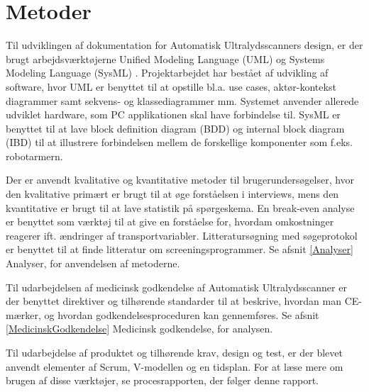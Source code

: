 \chapter{Metoder}\label{Metoder}

Til udviklingen af dokumentation for Automatisk Ultralydsscanners design, er der brugt arbejdsværktøjerne Unified Modeling Language (UML) \cite{UML}  og Systems Modeling Language (SysML) \cite{SysML}. Projektarbejdet har bestået af udvikling af software, hvor UML er benyttet til at opstille bl.a. use cases, aktør-kontekst diagrammer samt sekvens- og klassediagrammer mm. Systemet anvender allerede udviklet hardware, som PC applikationen skal have forbindelse til. SysML er benyttet til at lave block definition diagram (BDD) og internal block diagram (IBD) til at illustrere forbindelsen mellem de forskellige komponenter som f.eks. robotarmern.

Der er anvendt kvalitative og kvantitative metoder \cite {MetoderBruger} til brugerundersøgelser, hvor den kvalitative primært er brugt til at øge forståelsen i interviews, mens den kvantitative er brugt til at lave statistik på spørgeskema. En break-even analyse \cite{Erhvervsokonomi} er benyttet som værktøj til at give en forståelse for, hvordam omkostninger reagerer ift. ændringer af transportvariabler. Litteratursøgning med søgeprotokol er benyttet til at finde litteratur om screeningsprogrammer. Se afsnit \ref{Analyser} Analyser, for anvendelsen af metoderne. 

Til udarbejdelsen af medicinsk godkendelse af Automatisk Ultralydsscanner er der benyttet direktiver og tilhørende standarder til at beskrive, hvordan man CE-mærker, og hvordan godkendelsesproceduren kan gennemføres.  Se afsnit \ref{MedicinskGodkendelse} Medicinsk godkendelse, for analysen. 

Til udarbejdelse af produktet og tilhørende krav, design og test, er der blevet anvendt elementer af Scrum, V-modellen og en tidsplan. For at læse mere om brugen af disse værktøjer, se procesrapporten, der følger denne rapport.

